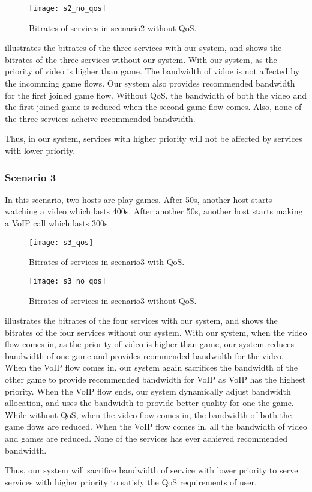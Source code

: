 \begin{figure}[htb]
\centering
\texttt{[image: s2\_no\_qos]}
\caption{Bitrates of services in scenario2 without QoS.}
\label{fig:s2_no_qos}
\end{figure}

 illustrates the bitrates of the three services with our system, and  shows the bitrates of the three services without our system. 
With our system, as the priority of video is higher than game. The bandwidth of vidoe is not affected by the incomming game flows. Our system also provides recommended bandwidth for the first joined game flow.
Without QoS, the bandwidth of both the video and the first joined game is reduced when the second game flow comes. Also, none of the three services acheive recommended bandwidth.

Thus, in our system, services with higher priority will not be affected by services with lower priority.

\subsubsection{Scenario 3}
In this scenario, two hosts are play games. After 50s, another host starts watching a video which lasts 400s. After another 50s, another host starts making a VoIP call which lasts 300s.

\begin{figure}[htb]
\centering
\texttt{[image: s3\_qos]}
\caption{Bitrates of services in scenario3 with QoS.}
\label{fig:s3_qos}
\end{figure}

\begin{figure}[htb]
\centering
\texttt{[image: s3\_no\_qos]}
\caption{Bitrates of services in scenario3 without QoS.}
\label{fig:s3_no_qos}
\end{figure}

 illustrates the bitrates of the four services with our system, and  shows the bitrates of the four services without our system. 
With our system, when the video flow comes in, as the priority of video is higher than game, our system reduces bandwidth of one game and provides reommended bandwidth for the video. When the VoIP flow comes in, our system again sacrifices the bandwidth of the other game to provide recommended bandwidth for VoIP as VoIP has the highest priority. When the VoIP flow ends, our system dynamically adjust bandwidth allocation, and uses the bandwidth to provide better quality for one the game.
While without QoS, when the video flow comes in, the bandwidth of both the game flows are reduced. When the VoIP flow comes in, all the bandwidth of video and games are reduced. None of the services has ever achieved recommended bandwidth.

Thus, our system will sacrifice bandwidth of service with lower priority to serve services with higher priority to satisfy the QoS requirements of user.
